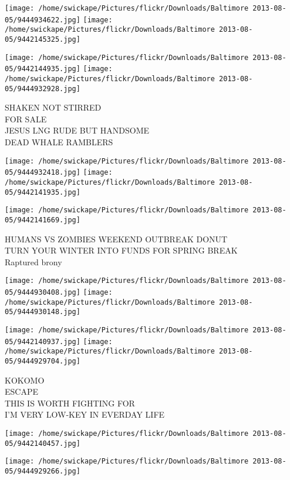 \documentclass[10pt,letterpaper]{article}
\begin{document}
\texttt{[image: /home/swickape/Pictures/flickr/Downloads/Baltimore 2013-08-05/9444934622.jpg]}
\texttt{[image: /home/swickape/Pictures/flickr/Downloads/Baltimore 2013-08-05/9442145325.jpg]}

\texttt{[image: /home/swickape/Pictures/flickr/Downloads/Baltimore 2013-08-05/9442144935.jpg]}
\texttt{[image: /home/swickape/Pictures/flickr/Downloads/Baltimore 2013-08-05/9444932928.jpg]}

SHAKEN NOT STIRRED\\
FOR SALE\\
JESUS LNG RUDE BUT HANDSOME\\
DEAD WHALE RAMBLERS
\pagebreak

\texttt{[image: /home/swickape/Pictures/flickr/Downloads/Baltimore 2013-08-05/9444932418.jpg]}
\texttt{[image: /home/swickape/Pictures/flickr/Downloads/Baltimore 2013-08-05/9442141935.jpg]}

\vspace{0.25in}
\texttt{[image: /home/swickape/Pictures/flickr/Downloads/Baltimore 2013-08-05/9442141669.jpg]}

HUMANS VS ZOMBIES WEEKEND OUTBREAK DONUT\\
TURN YOUR WINTER INTO FUNDS FOR SPRING BREAK\\
Raptured brony
\pagebreak

\texttt{[image: /home/swickape/Pictures/flickr/Downloads/Baltimore 2013-08-05/9444930408.jpg]}
\texttt{[image: /home/swickape/Pictures/flickr/Downloads/Baltimore 2013-08-05/9444930148.jpg]}

\texttt{[image: /home/swickape/Pictures/flickr/Downloads/Baltimore 2013-08-05/9442140937.jpg]}
\texttt{[image: /home/swickape/Pictures/flickr/Downloads/Baltimore 2013-08-05/9444929704.jpg]}

KOKOMO\\
ESCAPE\\
THIS IS WORTH FIGHTING FOR\\
I'M VERY LOW{-}KEY IN EVERDAY LIFE
\pagebreak

\texttt{[image: /home/swickape/Pictures/flickr/Downloads/Baltimore 2013-08-05/9442140457.jpg]}

\vspace{0.25in}
\texttt{[image: /home/swickape/Pictures/flickr/Downloads/Baltimore 2013-08-05/9444929266.jpg]}
\end{document}
